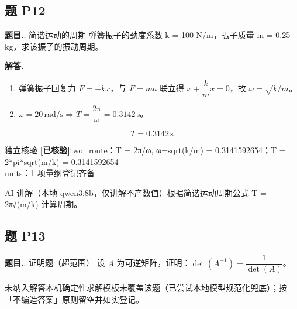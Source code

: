 \documentclass[11pt]{article}
\newcommand{\okmark}{\textcolor{okgreen}{\textbf{[已核验]}}}
\begin{document}
\subsection*{题 P12}
\noindent\textbf{题目.}. 简谐运动的周期
弹簧振子的劲度系数 k = 100 N/m，振子质量 m = 0.25 kg，求该振子的振动周期。\par
\vspace{4pt}\noindent\textbf{解答.}\quad
\begin{enumerate}[leftmargin=1.6em,itemsep=2pt]
  \item 弹簧振子回复力 $F=-kx$，与 $F=ma$ 联立得 $\ddot x+\dfrac km x=0$，故 $\omega=\sqrt{k/m}$。
  \item $\omega=20\,\mathrm{rad/s}\Rightarrow T=\dfrac{2\pi}{\omega}=0.3142\,\mathrm{s}$。
\end{enumerate}
\[ \boxed{T=0.3142\,\mathrm{s}} \]
\par
\begin{veribox}{独立核验 \okmark}two\_route：T = 2π/ω, ω=sqrt(k/m) = 0.3141592654；T = 2*pi*sqrt(m/k) = 0.3141592654\\units：1 项量纲登记齐备\end{veribox}
\begin{aibox}{AI 讲解（本地 qwen3:8b，仅讲解不产数值）}根据简谐运动周期公式 T = 2π√(m/k) 计算周期。\end{aibox}
\vspace{10pt}
\subsection*{题 P13}
\noindent\textbf{题目.}. 证明题（超范围）
设 $A$ 为可逆矩阵，证明：$\det(A^{-1}) = \dfrac{1}{\det(A)}$。\par
\begin{aibox}{未纳入解答}本机确定性求解模板未覆盖该题（已尝试本地模型规范化兜底）；按「不编造答案」原则留空并如实登记。\end{aibox}
\end{document}
